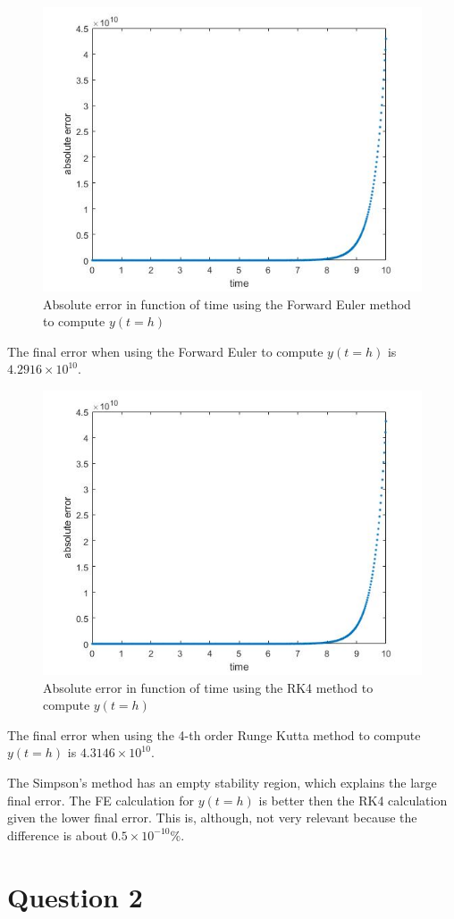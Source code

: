 \documentclass[a4paper, 11pt]{article}
\begin{document}
			\begin{figure}[H]
				\centering
				\includegraphics[width=.6\linewidth]{ex1_fe.jpg}
				\caption{Absolute error in function of time using the Forward Euler method to compute $y(t=h)$}
				\label{fig:ex1_fe}
			\end{figure}
			
			The final error when using the Forward Euler to compute $y(t=h)$ is $4.2916 \times 10^{10}$.
			
			\begin{figure}[H]
				\centering
				\includegraphics[width=.6\linewidth]{ex1_rk4.jpg}
				\caption{Absolute error in function of time using the RK4 method to compute $y(t=h)$}
				\label{fig:ex1_rk4}
			\end{figure}
			
			The final error when using the 4-th order Runge Kutta method to compute $y(t=h)$  is $4.3146 \times 10^{10}$.
			
			The Simpson's method has an empty stability region, which explains the large final error.
			The FE calculation for $y(t=h)$ is better then the RK4 calculation given the lower final error.
			This is, although, not very relevant because the difference is about $ 0.5 \times 10^{-10} \% $.
			
			\section*{Question 2}
			
\end{document}

